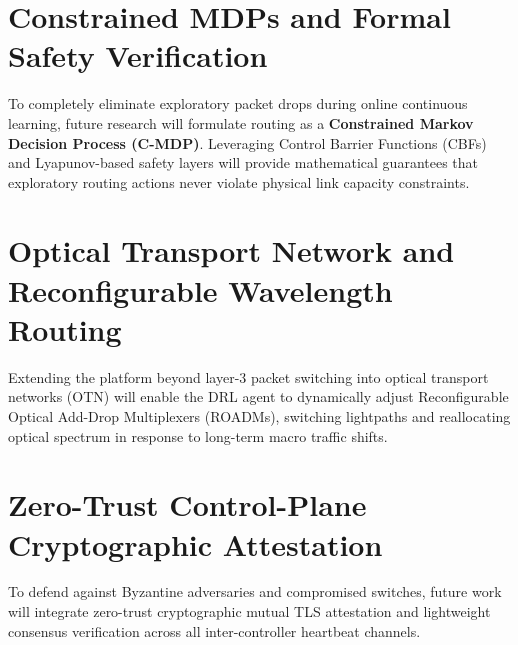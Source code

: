 \documentclass[12pt,a4paper,oneside]{report}
\begin{document}
\section{Constrained MDPs and Formal Safety Verification}
To completely eliminate exploratory packet drops during online continuous learning, future research will formulate routing as a \textbf{Constrained Markov Decision Process (C-MDP)}. Leveraging Control Barrier Functions (CBFs) and Lyapunov-based safety layers will provide mathematical guarantees that exploratory routing actions never violate physical link capacity constraints.

\section{Optical Transport Network and Reconfigurable Wavelength Routing}
Extending the platform beyond layer-3 packet switching into optical transport networks (OTN) will enable the DRL agent to dynamically adjust Reconfigurable Optical Add-Drop Multiplexers (ROADMs), switching lightpaths and reallocating optical spectrum in response to long-term macro traffic shifts.

\section{Zero-Trust Control-Plane Cryptographic Attestation}
To defend against Byzantine adversaries and compromised switches, future work will integrate zero-trust cryptographic mutual TLS attestation and lightweight consensus verification across all inter-controller heartbeat channels.
\end{document}

